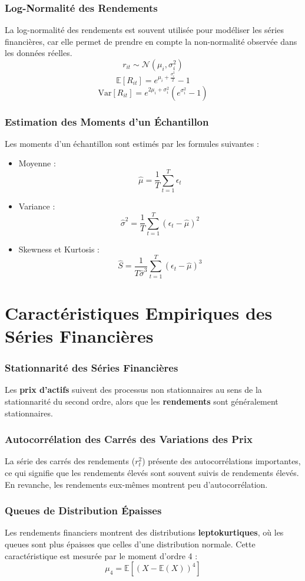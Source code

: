 \documentclass{beamer}
\begin{document}
\begin{frame}
  \frametitle{Log-Normalité des Rendements}
  La log-normalité des rendements est souvent utilisée pour modéliser les séries financières, car elle permet de prendre en compte la non-normalité observée dans les données réelles.
  \[
    r_{it} \sim \mathcal{N}(\mu_i, \sigma_i^2)
  \]
  \[
    \mathbb{E}[R_{it}] = e^{\mu_i + \frac{\sigma_i^2}{2}} - 1
  \]
  \[
    \text{Var}[R_{it}] = e^{2\mu_i + \sigma_i^2} (e^{\sigma_i^2} - 1)
  \]
\end{frame}

\begin{frame}
  \frametitle{Estimation des Moments d’un Échantillon}
  Les moments d’un échantillon sont estimés par les formules suivantes :
  \begin{itemize}
    \item Moyenne :
    \[
      \hat{\mu} = \frac{1}{T} \sum_{t=1}^{T} \epsilon_t
    \]
    \item Variance :
    \[
      \hat{\sigma}^2 = \frac{1}{T} \sum_{t=1}^{T} (\epsilon_t - \hat{\mu})^2
    \]
    \item Skewness et Kurtosis :
    \[
      \hat{S} = \frac{1}{T\hat{\sigma}^3} \sum_{t=1}^{T} (\epsilon_t - \hat{\mu})^3
    \]
  \end{itemize}
\end{frame}

\section{Caractéristiques Empiriques des Séries Financières}

\begin{frame}
  \frametitle{Stationnarité des Séries Financières}
  Les \textbf{prix d’actifs} suivent des processus non stationnaires au sens de la stationnarité du second ordre, alors que les \textbf{rendements} sont généralement stationnaires.
\end{frame}

\begin{frame}
  \frametitle{Autocorrélation des Carrés des Variations des Prix}
  La série des carrés des rendements (\( r_t^2 \)) présente des autocorrélations importantes, ce qui signifie que les rendements élevés sont souvent suivis de rendements élevés. En revanche, les rendements eux-mêmes montrent peu d'autocorrélation.
\end{frame}

\begin{frame}
  \frametitle{Queues de Distribution Épaisses}
  Les rendements financiers montrent des distributions \textbf{leptokurtiques}, où les queues sont plus épaisses que celles d'une distribution normale. Cette caractéristique est mesurée par le moment d'ordre 4 :
  \[
    \mu_4 = \mathbb{E}[(X - \mathbb{E}(X))^4]
  \]
\end{frame}
\end{document}

